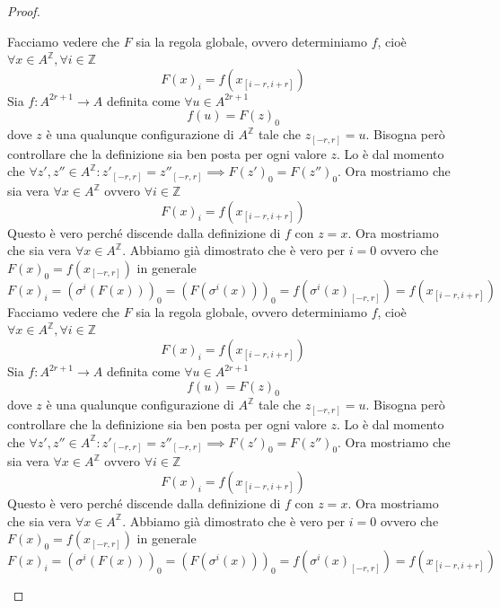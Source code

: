 \begin{teorema} 
\begin{proof}
\begin{itemize}
                  Facciamo vedere che $F$ sia la regola globale, ovvero determiniamo $f$, cioè
                  $\forall x\in A^\mathbb{Z},\forall i\in\mathbb{Z}$
                  $$F(x)_i = f(x_{[i-r,i+r]})$$
                  Sia $f: A^{2r+1}\rightarrow A$ definita come $\forall u \in A^{2r+1}$
                  $$f(u) = F(z)_0$$ dove $z$ è una qualunque configurazione di
                  $A^\mathbb{Z}$ tale che $z_{[-r,r]} = u$. Bisogna però controllare che
                  la definizione sia ben posta per ogni valore $z$. Lo è dal momento che
                  $\forall z',z''\in A^\mathbb{Z}: z'_{[-r,r]} =  z''_{[-r,r]}\implies F(z')_0 = F(z'')_0$.
                  Ora mostriamo che sia vera $\forall x\in A^\mathbb{Z}$ ovvero $\forall i \in \mathbb{Z}$
                  $$F(x)_i = f(x_{[i-r,i+r]})$$
                  Questo è vero perché discende dalla definizione di $f$ con $z = x$.
                  Ora mostriamo che sia vera $\forall x\in A^\mathbb{Z}$. Abbiamo
                  già dimostrato che è vero per $i=0$ ovvero che $F(x)_0 = f(x_{[-r,r]})$
                  in generale 
                  $$F(x)_i = (\sigma^i(F(x)))_0=(F(\sigma^i(x)))_0=f(\sigma^i(x)_{[-r,r]}) = f(x_{[i-r,i+r]})$$
                  Facciamo vedere che $F$ sia la regola globale, ovvero determiniamo $f$, cioè
                  $\forall x\in A^\mathbb{Z},\forall i\in\mathbb{Z}$
                  $$F(x)_i = f(x_{[i-r,i+r]})$$
                  Sia $f: A^{2r+1}\rightarrow A$ definita come $\forall u \in A^{2r+1}$
                  $$f(u) = F(z)_0$$ dove $z$ è una qualunque configurazione di
                  $A^\mathbb{Z}$ tale che $z_{[-r,r]} = u$. Bisogna però controllare che
                  la definizione sia ben posta per ogni valore $z$. Lo è dal momento che
                  $\forall z',z''\in A^\mathbb{Z}: z'_{[-r,r]} =  z''_{[-r,r]}\implies F(z')_0 = F(z'')_0$.
                  Ora mostriamo che sia vera $\forall x\in A^\mathbb{Z}$ ovvero $\forall i \in \mathbb{Z}$
                  $$F(x)_i = f(x_{[i-r,i+r]})$$
                  Questo è vero perché discende dalla definizione di $f$ con $z = x$.
                  Ora mostriamo che sia vera $\forall x\in A^\mathbb{Z}$. Abbiamo
                  già dimostrato che è vero per $i=0$ ovvero che $F(x)_0 = f(x_{[-r,r]})$
                  in generale 
                  $$F(x)_i = (\sigma^i(F(x)))_0=(F(\sigma^i(x)))_0=f(\sigma^i(x)_{[-r,r]}) = f(x_{[i-r,i+r]})$$
        \end{itemize}
    \end{proof}
\end{teorema}

